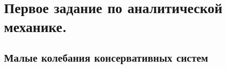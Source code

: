 



\section{Первое задание по аналитической механике.}


\subsection{Малые колебания консервативных систем}





